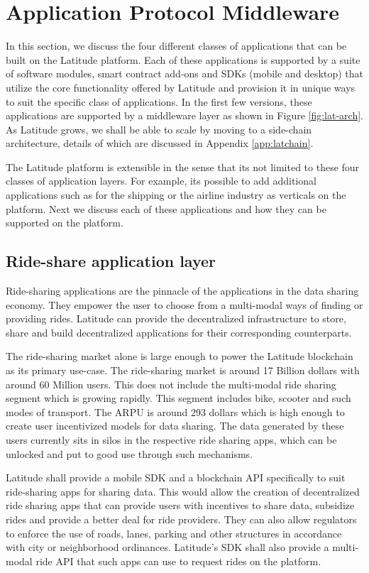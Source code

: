 \section{Application Protocol Middleware}
\label{sec:apps}

In this section, we discuss the four different classes of applications that can be built on the Latitude platform. Each
of these applications is supported by a suite of software modules, smart contract add-ons and SDKs (mobile and desktop)
that utilize the core functionality offered by Latitude and provision it in unique ways to suit the specific class of
applications. In the first few versions, these applications are supported by a middleware layer as shown in Figure
\ref{fig:lat-arch}. As Latitude grows, we shall be able to scale by moving to a side-chain architecture, details of
which are discussed in Appendix \ref{app:latchain}.

The Latitude platform is extensible in the sense that its not limited to these four classes of application layers. For
example, its possible to add additional applications such as for the shipping or the airline industry as verticals on
the platform. Next we discuss each of these applications and how they can be supported on the platform.

\subsection{Ride-share application layer}

Ride-sharing applications are the pinnacle of the applications in the data sharing economy. They empower the user to
choose from a multi-modal ways of finding or providing rides. Latitude can provide the decentralized infrastructure to
store, share and build decentralized applications for their corresponding counterparts.

The ride-sharing market alone is large enough to power the Latitude blockchain as its primary use-case. The ride-sharing
market is around 17 Billion dollars with around 60 Million users. This does not include the multi-modal ride sharing
segment which is growing rapidly. This segment includes bike, scooter and such modes of transport. The ARPU is around 
293 dollars which is high enough to create user incentivized models for data sharing. The data generated by these users
currently sits in silos in the respective ride sharing apps, which can be unlocked and put to good use through such
mechanisms. 

Latitude shall provide a mobile SDK and a blockchain API specifically to suit ride-sharing apps for sharing data. This
would allow the creation of decentralized ride sharing apps that can provide users with incentives to share data,
subsidize rides and provide a better deal for ride providers. They can also allow regulators to enforce the use of
roads, lanes, parking and other structures in accordance with city or neighborhood ordinances. Latitude's SDK shall also
provide a multi-modal ride API that such apps can use to request rides on the platform. 

